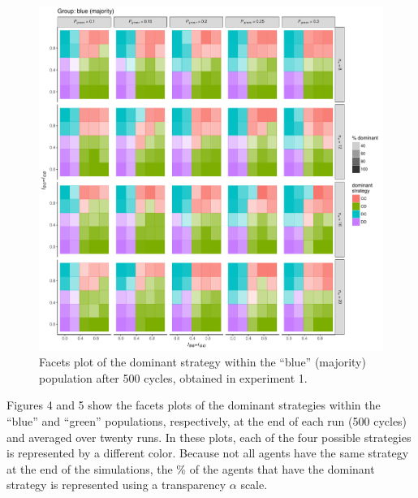 \begin{figure}[t!]
	\label{fig:strategyHostExperiment1}
	\begin{minipage}[c]{0.2\linewidth}
		\caption{Facets plot of the dominant strategy within the ``blue'' (majority) population after 500 cycles, obtained in experiment 1.}
	\end{minipage}
	\begin{minipage}[c]{0.75\linewidth}
		\includegraphics[trim={0cm 0cm 0.4cm 0cm}, clip, width=\linewidth]{figures/strategyHostExperiment1.pdf}
	\end{minipage}
\end{figure}

Figures 4 and 5 show the facets plots of the dominant strategies within the ``blue'' and ``green'' populations, respectively, at the end of each run (500 cycles) and averaged over twenty runs. In these plots, each of the four possible strategies is represented by a different color. Because not all agents have the same strategy at the end of the simulations, the \% of the agents that have the dominant strategy is represented using a transparency $ \alpha $ scale.

